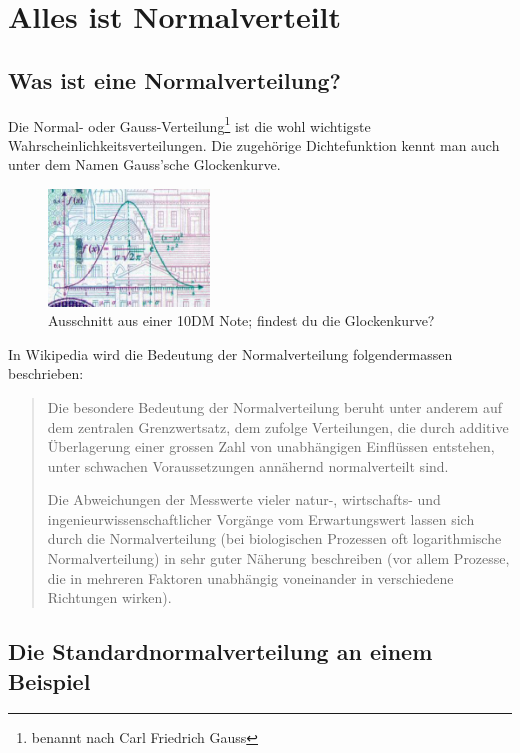 \documentclass[%
11pt,%
twoside,%
titlepage,%
german,%
headsepline%
]{scrartcl}
\newcommand{\definition}[1]{\colorbox{emerald}{#1}}
\begin{document}
\clearpage

\section{Alles ist Normalverteilt}

\subsection{Was ist eine Normalverteilung?}

Die Normal- oder Gauss-Verteilung\footnote{benannt nach Carl Friedrich Gauss} ist die wohl wichtigste Wahrscheinlichkeitsverteilungen. Die zugehörige Dichtefunktion kennt man auch unter dem Namen \definition{Gauss'sche Glockenkurve}.

\begin{figure}
    \centering
    \includegraphics[width=0.382\textwidth]{pictures/gauss}
    \caption{Ausschnitt aus einer 10DM Note; findest du die Glockenkurve?}
    \label{fig:glockenkurve}
\end{figure}

In Wikipedia wird die Bedeutung der Normalverteilung folgendermassen beschrieben:
\begin{quote}
 Die besondere Bedeutung der Normalverteilung beruht unter anderem auf dem zentralen Grenzwertsatz, dem zufolge Verteilungen, die durch additive Überlagerung einer grossen Zahl von unabhängigen Einflüssen entstehen, unter schwachen Voraussetzungen annähernd normalverteilt sind.
 
 Die Abweichungen der Messwerte vieler natur-, wirtschafts- und ingenieurwissenschaftlicher Vorgänge vom Erwartungswert lassen sich durch die Normalverteilung (bei biologischen Prozessen oft logarithmische Normalverteilung) in sehr guter Näherung beschreiben (vor allem Prozesse, die in mehreren Faktoren unabhängig voneinander in verschiedene Richtungen wirken).
\end{quote}

\subsection{Die Standardnormalverteilung an einem Beispiel}
\end{document}
